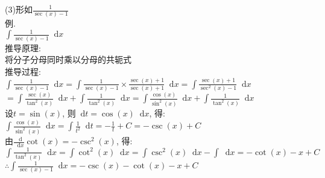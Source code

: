 \documentclass[UTF8, fontset=ubuntu, fleqn, fleqn]{ctexart}
\newcommand*{\dif}{\mathop{}\!\mathrm{d}}
\begin{document}
(3)形如$\displaystyle\frac{1}{\sec(x)-1}$\\
例.\\
$\displaystyle\int\frac{1}{\sec(x)-1}\dif x$\\
推导原理:\\
将分子分母同时乘以分母的共轭式\\
推导过程:\\
$\displaystyle\int\frac{1}{\sec(x)-1}\dif x=\int\frac{1}{\sec(x)-1}\times\frac{\sec(x)+1}{\sec(x)+1}\dif x=\int\frac{\sec(x)+1}{\sec^2(x)-1}\dif x$\\
\phantom{$\displaystyle\int\frac{1}{\sec(x)-1}\dif x$}$\displaystyle=\int\frac{\sec(x)}{\tan^2(x)}\dif x+\int\frac{1}{\tan^2(x)}\dif x=\int\frac{\cos(x)}{\sin^2(x)}\dif x+\int\frac{1}{\tan^2(x)}\dif x$\\
设$t=\sin(x)$, 则$\dif t=\cos(x)\dif x$, 得:\\
$\displaystyle\int\frac{\cos(x)}{\sin^2(x)}\dif x=\int\frac{1}{t^2}\dif t=-\frac{1}{t}+C=-\csc(x)+C$\\
由$\displaystyle\frac{\dif}{\dif x}\cot(x)=-\csc^2(x)$, 得:\\
$\displaystyle\int\frac{1}{\tan^2(x)}\dif x=\int\cot^2(x)\dif x=\int\csc^2(x)\dif x-\int\dif x=-\cot(x)-x+C$\\
$\therefore\displaystyle\int\frac{1}{\sec(x)-1}\dif x=-\csc(x)-\cot(x)-x+C$\\
\end{document}
